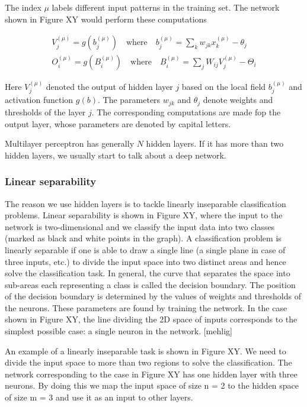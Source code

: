 The index $ \mu $ labels different input patterns in the training set. The network shown in Figure XY would perform these computations

\begin{gather}
V_j^{(\mu)} = g(b_j^{(\mu)}) \quad \text{where} \quad b_j^{(\mu)} = \sum_{k} w_{jk} x_{k}^{(\mu)} - \theta_{j} \\
O_i^{(\mu)} = g(B_i^{(\mu)}) \quad \text{where} \quad B_i^{(\mu)} = \sum_{j} W_{ij} V_{j}^{(\mu)} - \Theta_{i} 
\end{gather}

Here $ V_j^{(\mu)} $ denoted the output of hidden layer $ j $ based on the local field $ b_j^{(\mu)} $ and activation function $ g(b) $. The parameters $ w_{jk} $ and $ \theta_{j} $ denote weights and thresholds of the layer $ j $. The corresponding computations are made fop the output layer, whose parameters are denoted by capital letters. 

Multilayer perceptron has generally $ N $ hidden layers. If it has more than two hidden layers, we usually start to talk about a deep network. 

\subsubsection{Linear separability}

The reason we use hidden layers is to tackle linearly inseparable classification problems. Linear separability is shown in Figure XY, where the input to the network is two-dimensional and we classify the input data into two classes (marked as black and white points in the graph). A classification problem is linearly separable if one is able to draw a single line (a single plane in case of three inputs, etc.) to divide the input space into two distinct areas and hence solve the classification task. In general, the curve that separates the space into sub-areas each representing a class is called the decision boundary. The position of the decision boundary is determined by the values of weights and thresholds of the neurons. These parameters are found by training the network. In the case shown in Figure XY, the line dividing the 2D space of inputs corresponds to the simplest possible case: a single neuron in the network. [mehlig]

An example of a linearly inseparable task is shown in Figure XY. We need to divide the input space to more than two regions to solve the classification. The network corresponding to the case in Figure XY has one hidden layer with three neurons. By doing this we map the input space of size n = 2 to the hidden space of size m = 3 and use it as an input to other layers.

